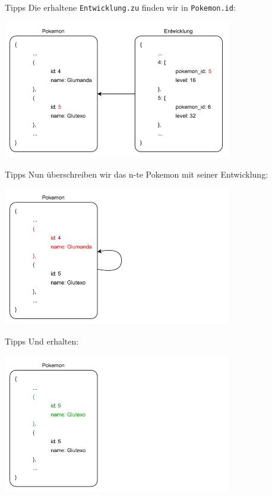 \begin{frame}{Tipps}
    Die erhaltene \texttt{Entwicklung.zu} finden wir in \texttt{Pokemon.id}:

    \begin{center}
        \includegraphics[width=0.75\textwidth]{pictures/example_3.pdf}
    \end{center}
\end{frame}

\begin{frame}{Tipps}
    Nun überschreiben wir das n-te Pokemon mit seiner Entwicklung:

    \begin{center}
        \includegraphics[width=0.75\textwidth]{pictures/example_4.pdf}
    \end{center}
\end{frame}

\begin{frame}{Tipps}
    Und erhalten:

    \begin{center}
        \includegraphics[width=0.75\textwidth]{pictures/example_5.pdf}
    \end{center}
\end{frame}

